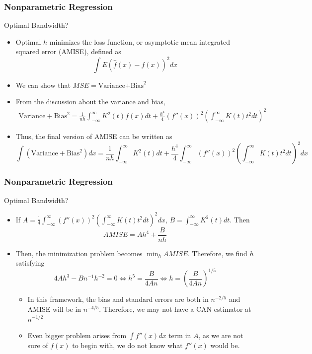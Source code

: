\documentclass{beamer}
\begin{document}
\begin{frame}
\frametitle{Nonparametric Regression}
Optimal Bandwidth?
\begin{itemize}
\item Optimal $h$ minimizes the loss function, or asymptotic mean integrated squared error (AMISE), defined as
 \[
 \int E(\hat{f}(x)-f(x))^2dx
 \]
\item We can show that $MSE=\text{Variance+Bias}^2$
\item From the discussion about the variance and bias, 
 \footnotesize{\begin{align*}
 \text{Variance}+\text{Bias}^2=\frac{1}{nh}\int_{-\infty}^\infty K^2(t)f(x)dt+\frac{h^4}{4}(f''(x))^2\left(\int_{-\infty}^\infty K(t)t^2dt\right)^2
 \end{align*}}\normalsize
\item  Thus, the final version of AMISE can be written as
 \footnotesize{\[
 \int(\text{Variance}+\text{Bias}^2)dx=\frac{1}{nh}\int_{-\infty}^\infty K^2(t)dt+\frac{h^4}{4}\int_{-\infty}^\infty(f''(x))^2\left(\int_{-\infty}^\infty K(t)t^2dt\right)^2 dx
 \]}\normalsize
\end{itemize}
\end{frame}

\begin{frame}
\frametitle{Nonparametric Regression}
Optimal Bandwidth?
\begin{itemize}
\item If  $A=\frac{1}{4}\int_{-\infty}^\infty(f''(x))^2\left(\int_{-\infty}^\infty K(t)t^2dt\right)^2 dx$, $B=\int_{-\infty}^\infty K^2(t)dt$. Then
 \[
 AMISE =Ah^4+\frac{B}{nh}
 \]
\item Then, the minimization problem becomes $\min_h AMISE$. Therefore, we find $h$ satisfying
 \[
 4Ah^3-Bn^{-1}h^{-2}=0\iff h^5=\frac{B}{4An} \iff h=\left(\frac{B}{4An}\right)^{1/5}
 \]
 \begin{itemize}
\item In this framework, the bias and standard errors are both in $n^{-2/5}$ and AMISE will be in $n^{-4/5}$. Therefore, we may not have a CAN estimator at $n^{-1/2}$
\item Even bigger problem arises from $\int f''(x)dx$ term in $A$, as we are not sure of $f(x)$ to begin with, we do not know what $f''(x)$ would be.
\end{itemize}
\end{itemize}
\end{frame}
\end{document}
